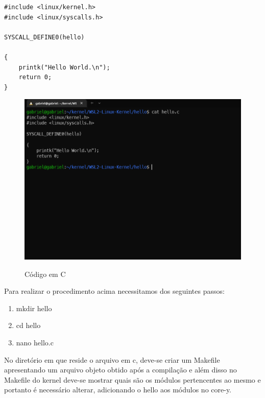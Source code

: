 \documentclass[a4paper, 12pt]{article}
\begin{document}
\begin{lstlisting} 
#include <linux/kernel.h>
#include <linux/syscalls.h>

SYSCALL_DEFINE0(hello)

{
    printk("Hello World.\n");
    return 0;
} 
\end{lstlisting}

\begin{figure}[h]
\centering 
\includegraphics[width=13.5cm]{cat_hello.png}
\label{figura:cathello}
\caption{Código em C}
\end{figure}

Para realizar o procedimento acima necessitamos dos seguintes passos:

\begin{enumerate}
    \item mkdir hello
    \item cd hello
    \item nano hello.c
\end{enumerate}

No diretório em que reside o arquivo em c, deve-se criar um Makefile apresentando um arquivo objeto obtido após a compilação e além disso no Makefile do kernel deve-se mostrar quais são os módulos pertencentes ao mesmo e portanto é necessário alterar, adicionando o hello aos módulos no core-y.
\end{document}
